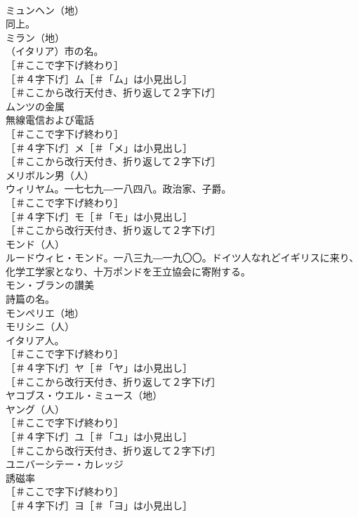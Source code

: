 \documentclass[8pt]{extreport}
\begin{document}
\begin{CJK}{UTF8}{min}
\\	ミュンヘン（地）
\\	同上。
\\	ミラン（地）
\\	（イタリア）市の名。
\\	［＃ここで字下げ終わり］
\\	［＃４字下げ］ム［＃「ム」は小見出し］
\\	［＃ここから改行天付き、折り返して２字下げ］
\\	ムンツの金属 
\\	無線電信および電話 
\\	［＃ここで字下げ終わり］
\\	［＃４字下げ］メ［＃「メ」は小見出し］
\\	［＃ここから改行天付き、折り返して２字下げ］
\\	メリボルン男（人）
\\	ウィリヤム。一七七九―一八四八。政治家、子爵。
\\	［＃ここで字下げ終わり］
\\	［＃４字下げ］モ［＃「モ」は小見出し］
\\	［＃ここから改行天付き、折り返して２字下げ］
\\	モンド（人）
\\	ルードウィヒ・モンド。一八三九―一九〇〇。ドイツ人なれどイギリスに来り、化学工学家となり、十万ポンドを王立協会に寄附する。
\\	モン・ブランの讃美 
\\	詩篇の名。
\\	モンペリエ（地）
\\	モリシニ（人）
\\	イタリア人。
\\	［＃ここで字下げ終わり］
\\	［＃４字下げ］ヤ［＃「ヤ」は小見出し］
\\	［＃ここから改行天付き、折り返して２字下げ］
\\	ヤコブス・ウエル・ミュース（地）
\\	ヤング（人）
\\	［＃ここで字下げ終わり］
\\	［＃４字下げ］ユ［＃「ユ」は小見出し］
\\	［＃ここから改行天付き、折り返して２字下げ］
\\	ユニバーシテー・カレッジ 
\\	誘磁率 
\\	［＃ここで字下げ終わり］
\\	［＃４字下げ］ヨ［＃「ヨ」は小見出し］

\end{CJK}
\end{document}
